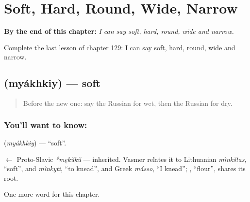 
\chapter{Soft, Hard, Round, Wide, Narrow}
\label{ch:ru-soft-hard-round-wide-narrow}

\begin{chapteropening}
\textbf{By the end of this chapter:} \emph{I can say soft, hard, round, wide and narrow.}

Complete the last lesson of chapter 129: I can say soft, hard, round, wide and narrow.
\end{chapteropening}

\section[\texorpdfstring{\ru{мягкий} (myákhkiy)}{мягкий (myákhkiy)}]{ (myákhkiy) — soft}

\label{lesson:RU-C129-soft}



\begin{quote}
Before the new one: say the Russian for wet, then the Russian for dry.
\end{quote}

\subsection*{You'll want to know: }
\textbf{} (\emph{myákhkiy}) — \textquotedblleft{}soft\textquotedblright{}.

\begin{cousinweb}
\textbf{} $\leftarrow$ Proto-Slavic \emph{*mękŭkŭ} — inherited. Vasmer relates it to Lithuanian \emph{mìnkštas}, \textquotedblleft{}soft\textquotedblright{}, and \emph{mìnkyti}, \textquotedblleft{}to knead\textquotedblright{}, and Greek \emph{mássō}, \textquotedblleft{}I knead\textquotedblright{}; \emph{}, \textquotedblleft{}flour\textquotedblright{}, shares its root.
\end{cousinweb}

\begin{grammarlens}[title={What you've built}]
One more word for this chapter.
\end{grammarlens}

